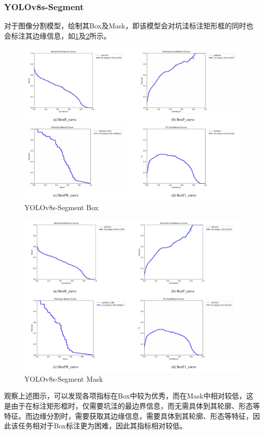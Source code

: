 \documentclass{MathorCupmodeling}
\begin{document}
	\subsubsection{YOLOv8s-Segment}
	对于图像分割模型，绘制其Box及Mask，即该模型会对坑洼标注矩形框的同时也会标注其边缘信息，如\textcolor{blue}{\cref{fig:YOLOv8s-Segment-Box}}及\textcolor{blue}{\cref{fig:YOLOv8s-Segment-Mask}}所示。
	\begin{figure}[H]
		\centering
		\includegraphics[scale=0.5]{Figures/segment/SegmentBox.pdf}
		\caption{YOLOv8s-Segment Box}
		\label{fig:YOLOv8s-Segment-Box}
	\end{figure}
	\begin{figure}[H]
		\centering
		\includegraphics[scale=0.5]{Figures/segment/SegmentMask.pdf}
		\caption{YOLOv8s-Segment Mask}
		\label{fig:YOLOv8s-Segment-Mask}
	\end{figure}
	观察上述图示，可以发现各项指标在Box中较为优秀，而在Mask中相对较低，这是由于在标注矩形框时，仅需要坑洼的最边界信息，而无需具体到其轮廓、形态等特征。而边缘分割时，需要获取其边缘信息，需要具体到其轮廓、形态等特征，因此该任务相对于Box标注更为困难，因此其指标相对较低。
\end{document}
